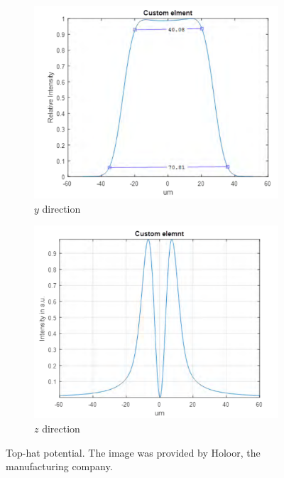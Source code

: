 \begin{figure}
    \begin{subfigure}{0.5\textwidth}
        \centering
        \includegraphics[width=\textwidth]{chapters/chapter_2/figures/tophatx.png}
        \caption{$y$ direction}
        \label{fig:tophatx}
    \end{subfigure}
    \begin{subfigure}{0.5\textwidth}
        \centering
        \includegraphics[width=\textwidth]{chapters/chapter_2/figures/tophaty.png}
        \caption{$z$ direction}
        \label{fig:tophaty}
    \end{subfigure}
    \caption{Top-hat potential. The image was provided by Holoor, the manufacturing company.}
    \label{fig:tophat}
\end{figure}